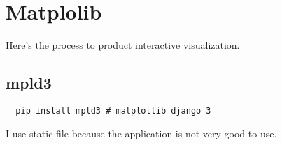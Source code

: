 
\chapter{Matplolib}

Here's the process to product interactive visualization.

\section{mpld3}

\begin{lstlisting}
  pip install mpld3 # matplotlib django 3
\end{lstlisting}

I use static file because the application is not very good to use.